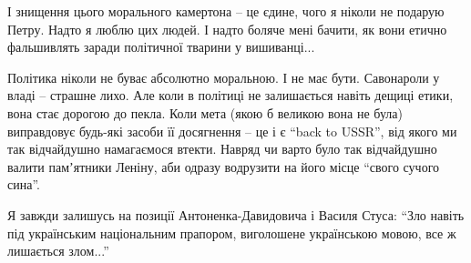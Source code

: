 І знищення цього морального камертона – це єдине, чого я ніколи не подарую
Петру. Надто я люблю цих людей. І надто боляче мені бачити, як вони етично
фальшивлять заради політичної тварини у вишиванці...

Політика ніколи не буває абсолютно моральною. І не має бути. Савонароли у владі
– страшне лихо. Але коли в політиці не залишається навіть дещиці етики, вона
стає дорогою до пекла. Коли мета (якою б великою вона не була) виправдовує
будь-які засоби її досягнення – це і є \enquote{back to USSR}, від якого ми так
відчайдушно намагаємося втекти. Навряд чи варто було так відчайдушно валити
памʼятники Леніну, аби одразу водрузити на його місце \enquote{свого сучого сина}.

Я завжди залишусь на позиції Антоненка-Давидовича і Василя Стуса: \enquote{Зло навіть
під українським національним прапором, виголошене українською мовою, все ж
лишається злом...}
